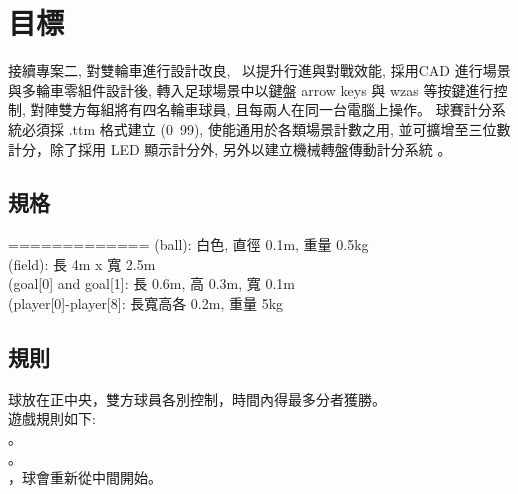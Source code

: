 \chapter{目標}
接續專案二, 對雙輪車進行設計改良,  以提升行進與對戰效能, 採用CAD 進行場景與多輪車零組件設計後, 轉入足球場景中以鍵盤 arrow keys 與 wzas 等按鍵進行控制, 對陣雙方每組將有四名輪車球員, 且每兩人在同一台電腦上操作。
球賽計分系統必須採 .ttm 格式建立 (0~99), 使能通用於各類場景計數之用, 並可擴增至三位數計分，除了採用 LED 顯示計分外, 另外以建立機械轉盤傳動計分系統 。

\section{規格}
=============
 (ball): 白色, 直徑 0.1m, 重量 0.5kg \\
 (field): 長 4m x 寬 2.5m \\
 (goal[0] and goal[1]: 長 0.6m, 高 0.3m, 寬 0.1m \\
 (player[0]-player[8]: 長寬高各 0.2m, 重量 5kg \\

\section{規則}
球放在正中央，雙方球員各別控制，時間內得最多分者獲勝。 \\

遊戲規則如下: \\
。 \\
。 \\
，球會重新從中間開始。 \\
